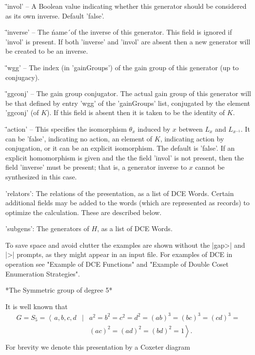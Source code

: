 \= 'invol'  --  A Boolean  value indicating whether this generator should
be considered as its own inverse. Default 'false'.

\= 'inverse' -- The \'name\'\  of the  inverse  of this  generator.  This
field is ignored if 'invol' is present. If both 'inverse' and 'invol' are
absent then a new generator will be created to be an inverse.

\= 'wgg' --  The  index  (in  'gainGroups')  of  the  gain  group of this
generator (up to conjugacy).

\= 'ggconj' -- The gain group conjugator.  The actual  gain group of this
generator will be that  defined by entry  'wgg' of the 'gainGroups' list,
conjugated by  the  element 'ggconj'  (of $K$). If   this field is absent
then it is taken to be the identity of $K$.

\= 'action' -- This specifies  the isomorphism  $\theta_x$ induced by $x$
between $L_x$ and $L_{x^{-1}}$.  It can be 'false', indicating no action,
an  element  of  $K$,  indicating  action by conjugation, or it can be an
explicit isomorphism. The default is 'false'. If an explicit homomorphism
is  given  and  the the field  'invol'  is not  present,  then  the field
'inverse' must  be present;  that is,  a generator inverse to  $x$ cannot
be synthesized in this case.

'relators':  The relations  of  the   presentation, as   a list   of  DCE
Words. Certain additional  fields may be   added to the words (which  are
represented as records) to optimize the  calculation. These are described
below.

'subgens': The generators of $H$, as a list of DCE Words.


To save space and avoid clutter the examples are shown without the |gap>|
and |>| prompts,  as they might appear in  an input file. For examples of
DCE in operation  see "Example of  DCE Functions" and "Example  of Double
Coset Enumeration Strategies".

\vspace{5mm}
*The Symmetric group of degree 5*

It is well known that
\begin{displaymath}\begin{array}{rcl}
G = S_5 = \left\langle\,a,b,c,d \right.&\mid& a^2 = b^2 = c^2 = d^2 =
(ab)^3 = (bc)^3 = (cd)^3 = \\
&&\left.(ac)^2 = (ad)^2 = (bd)^2 = 1\right\rangle.\\
\end{array}\end{displaymath}
For brevity we denote this presentation by a Coxeter diagram\:

